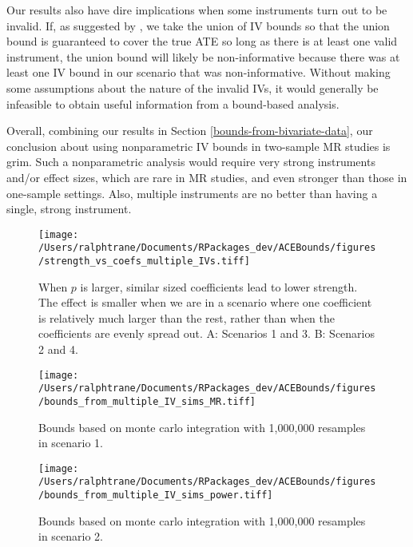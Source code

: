 \documentclass[AMA,STIX1COL,]{WileyNJD-v2}
\begin{document}
Our results also have dire implications when some instruments turn out
to be invalid. If, as suggested by \citep{swanson_commentary_2017}, we
take the union of IV bounds so that the union bound is guaranteed to
cover the true ATE so long as there is at least one valid instrument,
the union bound will likely be non-informative because there was at
least one IV bound in our scenario that was non-informative. Without
making some assumptions about the nature of the invalid IVs, it would
generally be infeasible to obtain useful information from a bound-based
analysis.

Overall, combining our results in Section
\ref{bounds-from-bivariate-data}, our conclusion about using
nonparametric IV bounds in two-sample MR studies is grim. Such a
nonparametric analysis would require very strong instruments and/or
effect sizes, which are rare in MR studies, and even stronger than those
in one-sample settings. Also, multiple instruments are no better than
having a single, strong instrument.

\begin{figure}
  \centering
  \texttt{[image: /Users/ralphtrane/Documents/RPackages\_dev/ACEBounds/figures/strength\_vs\_coefs\_multiple\_IVs.tiff]}
  \caption{When $p$ is larger, similar sized coefficients lead to lower strength. The effect is smaller when we are in a scenario where one coefficient is relatively much larger than the rest, rather than when the coefficients are evenly spread out. A: Scenarios 1 and 3. B: Scenarios 2 and 4.}
  \label{fig:strength_vs_coef_multiple_IVs}
\end{figure}

\clearpage

\begin{sidewaysfigure}
  \centering
  \texttt{[image: /Users/ralphtrane/Documents/RPackages\_dev/ACEBounds/figures/bounds\_from\_multiple\_IV\_sims\_MR.tiff]}
  \caption{Bounds based on monte carlo integration with 1,000,000 resamples in scenario 1.}
  \label{fig:bounds_from_multiple_IV_sims_MR}
\end{sidewaysfigure}

\clearpage

\begin{sidewaysfigure}
  \centering
  \texttt{[image: /Users/ralphtrane/Documents/RPackages\_dev/ACEBounds/figures/bounds\_from\_multiple\_IV\_sims\_power.tiff]}
  \caption{Bounds based on monte carlo integration with 1,000,000 resamples in scenario 2.}
  \label{fig:bounds_from_multiple_IV_sims_power}
\end{sidewaysfigure}
\end{document}
